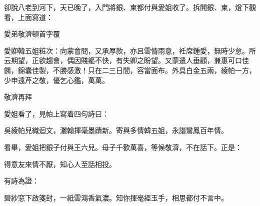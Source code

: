 卻說八老到河下，天已晚了，入門將銀、柬都付與愛姐收了。拆開銀、柬，燈下觀看，上面寫道：

愛弟敬濟頓首字覆

愛卿韓五姐粧次：向蒙會問，又承厚款，亦且雲情雨意，衽席鍾愛，無時少怠。所云期望，正欲趨會，偶因賤軀不快，有失卿之盼望。又蒙遣人垂顧，兼惠可口佳餚，錦囊佳製，不勝感激！只在二三日間，容當面布。外具白金五兩，綾帕一方，少申遠芹之敬，優乞心鑑，萬萬。

敬濟再拜

愛姐看了，見帕上寫着四句詩曰：

吳綾帕兒織迴文，灑翰揮毫墨蹟新。寄與多情韓五姐，永諧鸞鳳百年情。

看畢，愛姐把銀子付與王六兒。母子千歡萬喜，等候敬濟，不在話下。正是：

得意友來情不厭，知心人至話相投。

有詩為證：

碧紗窓下啟箋封，一紙雲鴻香氣濃。知你揮毫經玉手，相思都付不言中。

